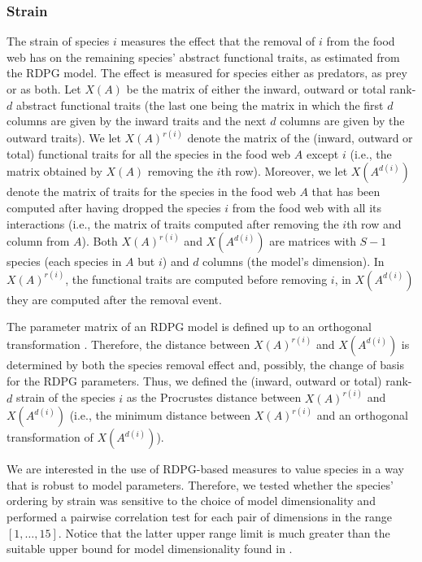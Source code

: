 \documentclass[]{rsos}%
\begin{document}
\subsubsection{Strain}
The strain of species $i$ measures the effect that the removal of $i$ from the food web
has on the remaining species' abstract functional traits, as estimated from the
RDPG model. The effect is measured for species either as predators, as prey or as both. 
Let $X(A)$ be the matrix of either the inward, outward or total rank-$d$ abstract
functional traits (the last one being the matrix in  which the first $d$ columns are
given by the inward traits and the next $d$ columns are given by the outward traits).
We let $X(A)^{r(i)}$ denote the matrix of the (inward, outward or total)
functional traits for all the species in the food web $A$ except $i$ (i.e.,
the matrix obtained by $X(A)$ removing the $i$th row). Moreover, we let
$X\left(A^{d(i)}\right)$ denote the matrix of traits for the species in the food
web $A$ that has been computed after having dropped the species $i$ from the food web with
all its interactions (i.e., the matrix of traits computed after removing the $i$th row and column from $A$).
Both $X(A)^{r(i)}$ and $X\left(A^{d(i)}\right)$ are matrices with $S-1$ species (each species
in $A$ but $i$) and $d$ columns (the model's dimension). In $X(A)^{r(i)}$, the functional
traits are computed before removing $i$, in $X\left(A^{d(i)}\right)$ they are computed
after the removal event.

The parameter matrix of an RDPG model is defined up to an orthogonal transformation
\citep{dallariva2015exploring}. Therefore, the distance between
$X(A)^{r(i)}$ and $X\left(A^{d(i)}\right)$ is determined by both the species
removal effect and, possibly, the change of basis for the RDPG parameters.
Thus, we defined the (inward, outward or total) rank-$d$ strain of the species $i$ as
the Procrustes distance \citep{dryden1998statistical} between $X(A)^{r(i)}$ and $X\left(A^{d(i)}\right)$
(i.e., the minimum distance between $X(A)^{r(i)}$ and an orthogonal transformation of $X\left(A^{d(i)}\right)$).

We are interested in the use of RDPG-based measures to value species in a way that
is robust to model parameters. Therefore, we tested whether the species' ordering by strain
was sensitive to the choice of model dimensionality and performed a pairwise correlation test for each pair of
dimensions in the range $\left[1, \dots, 15 \right]$. Notice that the latter upper
range limit is much greater than the suitable upper bound for model dimensionality found
in \citep{dallariva2015exploring}.
\end{document}
